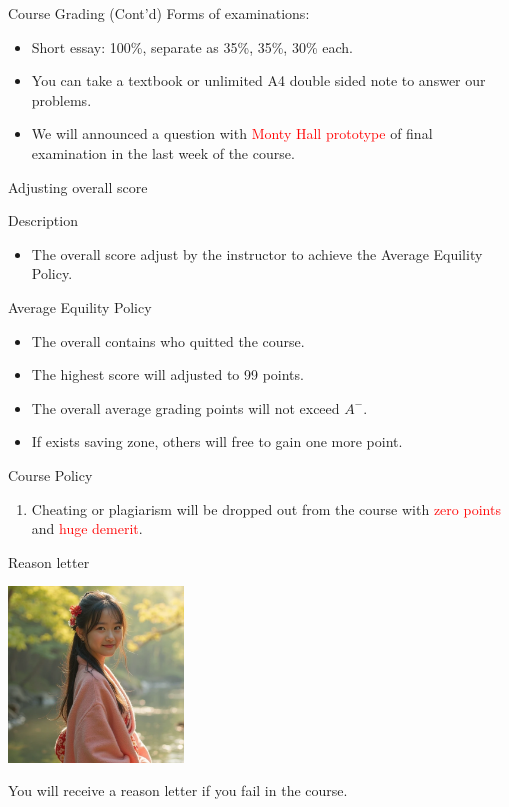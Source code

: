 \documentclass{beamer}
\begin{document}
\begin{frame}{Course Grading (Cont'd)}
Forms of examinations:
\begin{itemize}
\item Short essay: 100\%, separate as 35\%, 35\%, 30\% each.
\item You can take a textbook or unlimited A4 double sided note to answer our problems.
\item We will announced a question with \textcolor{red}{Monty Hall prototype} of final examination in the last week of the course.
\end{itemize}
\end{frame}
\begin{frame}{Adjusting overall score}
\begin{block}{Description}
\begin{itemize}
\item The overall score adjust by the instructor to achieve the Average Equility Policy.
\end{itemize}
\end{block}
\begin{block}{Average Equility Policy}
\begin{itemize}
\item The overall contains who quitted the course.
\item The highest score will adjusted to 99 points.
\item The overall average grading points will not exceed $A^-$.
\item If exists saving zone, others will free to gain one more point.
\end{itemize}
\end{block}
\end{frame}
\begin{frame}{Course Policy}
\begin{enumerate}
\item Cheating or plagiarism will be dropped out from the course with \textcolor{red}{zero points} and \textcolor{red}{huge demerit}. \\
\end{enumerate}
\end{frame}
\begin{frame}{Reason letter}
\begin{center}
\includegraphics[width=0.35\textwidth]{endeavor.png}
\end{center}
\begin{center}
You will receive a reason letter if you fail in the course.
\end{center}
\end{frame}
\end{document}
